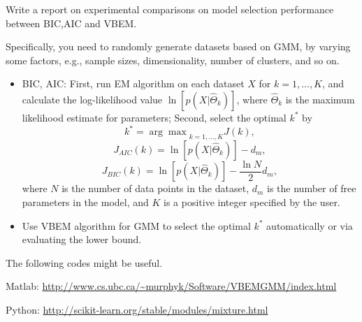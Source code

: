 \documentclass{article}
\begin{document}
Write a report on experimental comparisons on model selection performance between BIC,AIC and VBEM.

Specifically, you need to randomly generate datasets based on GMM, by varying some factors, e.g., sample sizes, dimensionality, number of clusters, and so on. 
\begin{itemize}

\item BIC, AIC: First, run EM algorithm on each dataset $X$ for $k=1,...,K$, and calculate the log-likelihood value $\ln[p(X|\hat{\Theta}_k)]$, where $\hat{\Theta}_k$ is the maximum likelihood estimate for parameters; Second, select the optimal $k^*$ by
\begin{equation}
    k^*={\arg\max}_{k=1,\ldots,K} {J(k)},
\end{equation}
\begin{equation}
    J_{AIC}(k) = \ln[p(X|\hat{\Theta}_k)] - d_m,
\end{equation}
\begin{equation}
    J_{BIC}(k) = \ln[p(X|\hat{\Theta}_k)] - \frac{\ln N}{2} d_m,
\end{equation}
where $N$ is the number of data points in the dataset, $d_m$ is the number of free parameters in the model, and $K$ is a positive integer specified by the user.

\item Use VBEM algorithm for GMM to select the optimal $k^*$ automatically or via evaluating the lower bound.

\end{itemize}

The following codes might be useful.

Matlab: \url{http://www.cs.ubc.ca/~murphyk/Software/VBEMGMM/index.html}

Python: \url{http://scikit-learn.org/stable/modules/mixture.html}
\end{document}
